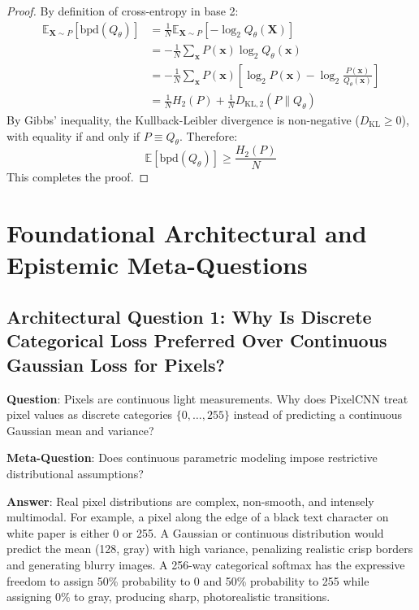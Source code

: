 \documentclass[11pt,a4paper]{article}
\theoremstyle{definition}
\begin{document}
\begin{proof}
By definition of cross-entropy in base 2:
{\boldmath
\begin{align}
\mathbb{E}_{\mathbf{X} \sim P}\left[ \text{bpd}(Q_\theta) \right] &= \frac{1}{N} \mathbb{E}_{\mathbf{X} \sim P}\left[ -\log_2 Q_\theta(\mathbf{X}) \right] \\
&= -\frac{1}{N} \sum_{\mathbf{x}} P(\mathbf{x}) \log_2 Q_\theta(\mathbf{x}) \\
&= -\frac{1}{N} \sum_{\mathbf{x}} P(\mathbf{x}) \left[ \log_2 P(\mathbf{x}) - \log_2 \frac{P(\mathbf{x})}{Q_\theta(\mathbf{x})} \right] \\
&= \frac{1}{N} H_2(P) + \frac{1}{N} D_{\text{KL}, 2}(P \parallel Q_\theta)
\end{align}
}
By Gibbs' inequality, the Kullback-Leibler divergence is non-negative ($D_{\text{KL}} \ge 0$), with equality if and only if $P \equiv Q_\theta$.
Therefore:
{\boldmath
\begin{equation}
\mathbb{E}[\text{bpd}(Q_\theta)] \ge \frac{H_2(P)}{N}
\end{equation}
}
This completes the proof.
\end{proof}

\section{Foundational Architectural and Epistemic Meta-Questions}

\subsection{Architectural Question 1: Why Is Discrete Categorical Loss Preferred Over Continuous Gaussian Loss for Pixels?}
\textbf{Question}: Pixels are continuous light measurements. Why does PixelCNN treat pixel values as discrete categories $\{0, \dots, 255\}$ instead of predicting a continuous Gaussian mean and variance?

\textbf{Meta-Question}: Does continuous parametric modeling impose restrictive distributional assumptions?

\textbf{Answer}: Real pixel distributions are complex, non-smooth, and intensely multimodal. For example, a pixel along the edge of a black text character on white paper is either 0 or 255. A Gaussian or continuous distribution would predict the mean (128, gray) with high variance, penalizing realistic crisp borders and generating blurry images. A 256-way categorical softmax has the expressive freedom to assign 50\% probability to 0 and 50\% probability to 255 while assigning 0\% to gray, producing sharp, photorealistic transitions.
\end{document}
